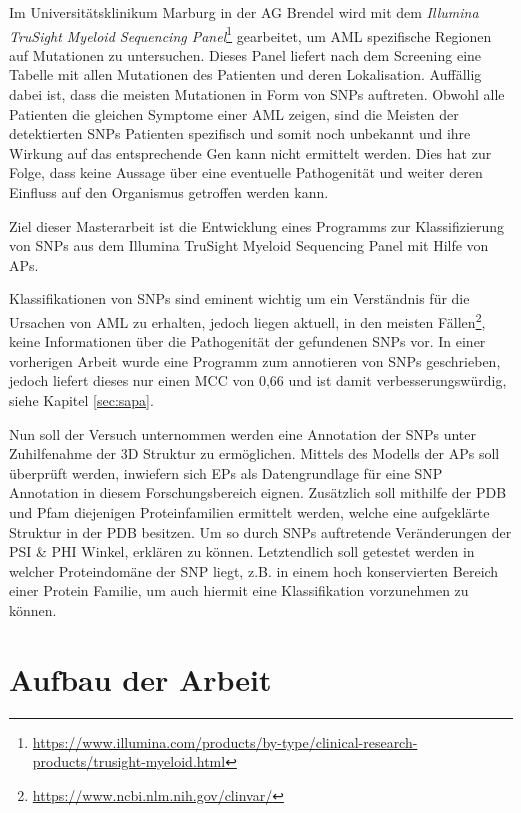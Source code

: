Im Universitätsklinikum Marburg in der AG Brendel wird mit dem \emph{Illumina TruSight Myeloid Sequencing Panel}\footnote{\url{https://www.illumina.com/products/by-type/clinical-research-products/trusight-myeloid.html}} gearbeitet, um \ac{AML} spezifische Regionen auf Mutationen zu untersuchen. Dieses Panel liefert nach dem Screening eine Tabelle mit allen Mutationen des Patienten und deren Lokalisation. Auffällig dabei ist, dass die meisten Mutationen in Form von \ac{SNPs} auftreten. Obwohl alle Patienten die gleichen Symptome einer \ac{AML} zeigen, sind die Meisten der detektierten \ac{SNPs} Patienten spezifisch und somit noch unbekannt und ihre Wirkung auf das entsprechende Gen kann nicht ermittelt werden. Dies hat zur Folge, dass keine Aussage über eine eventuelle Pathogenität und weiter deren Einfluss auf den Organismus getroffen werden kann. 

Ziel dieser Masterarbeit ist die Entwicklung eines Programms zur Klassifizierung von \ac{SNPs} aus dem Illumina TruSight Myeloid Sequencing Panel mit Hilfe von \ac{APs}.

Klassifikationen von \ac{SNPs} sind eminent wichtig um ein Verständnis für die Ursachen von \ac{AML} zu erhalten, jedoch liegen aktuell, in den meisten Fällen\footnote{\url{https://www.ncbi.nlm.nih.gov/clinvar/}}, keine Informationen über die Pathogenität der gefundenen \ac{SNPs} vor. In einer vorherigen Arbeit wurde eine Programm zum annotieren von \ac{SNPs} geschrieben, jedoch liefert dieses nur einen \ac{MCC} von 0,66 und ist damit verbesserungswürdig, siehe Kapitel \ref{sec:sapa}. 

Nun soll der Versuch unternommen werden eine Annotation der \ac{SNPs} unter Zuhilfenahme der 3D Struktur zu ermöglichen. Mittels des Modells der \ac{APs} soll überprüft werden, inwiefern sich \ac{EPs} als Datengrundlage für eine \ac{SNP} Annotation in diesem Forschungsbereich eignen. Zusätzlich soll mithilfe der \ac{PDB} und \ac{Pfam} diejenigen Proteinfamilien ermittelt werden, welche eine aufgeklärte Struktur in der \ac{PDB} besitzen. Um so durch \ac{SNPs} auftretende Veränderungen der PSI \& PHI Winkel, erklären zu können. Letztendlich soll getestet werden in welcher Proteindomäne der \ac{SNP} liegt, z.B. in einem hoch konservierten Bereich einer Protein Familie, um auch hiermit eine Klassifikation vorzunehmen zu können.



\section{Aufbau der Arbeit}

